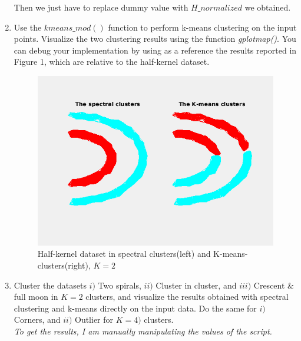 \documentclass[unicode,11pt,a4paper,oneside,numbers=endperiod,openany]{scrartcl}
\begin{document}
\begin{enumerate}
Then we just have to replace dummy value with ${H\_normalized}$ we obtained.

\item{Use the ${kmeans\_mod()}$ function to perform k-means clustering on the input points. Visualize the two clustering results using the function \textit{gplotmap()}. You can debug your implementation by using as a reference the
results reported in Figure 1, which are relative to the half-kernel dataset.} \\

  \begin{figure}[h!]
    \begin{minipage}[c]{1\linewidth}
        \centering
        \includegraphics[width=0.8\linewidth]{./figures/half_k_clusters.png}
    \end{minipage}
  \caption{Half-kernel dataset in spectral clusters(left) and K-means-clusters(right), ${K=2}$}
\end{figure}

\vspace{20px}

\item {Cluster the datasets ${i)}$ Two spirals, ${ii)}$ Cluster in cluster, and ${iii)}$ Crescent ${\&}$ full moon in ${K=2}$ clusters, and
visualize the results obtained with spectral clustering and k-means directly on the input data. Do the same for
${i)}$ Corners, and ${ii)}$ Outlier for ${K=4)}$ clusters.}\\

\textit{To get the results, I am manually manipulating the values of the script.}


\end{enumerate}
\end{document}
